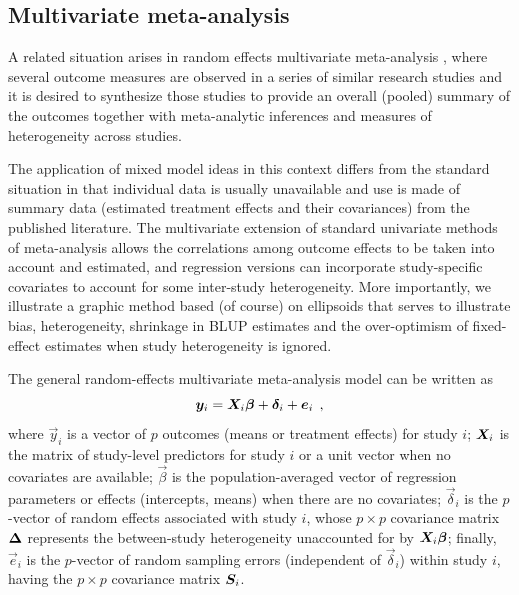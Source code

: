 \subsection{Multivariate meta-analysis}
A related situation arises in random effects multivariate
meta-analysis
\citep{Berkey-etal:1998,Nam-etal:2003},
where several outcome measures are observed in a series of
similar research studies and it is desired to synthesize
those studies to provide an overall (pooled) summary of the outcomes
together with meta-analytic inferences and
measures of heterogeneity across studies.  

The application of mixed model ideas in this context differs
from the standard situation in that individual data is
usually unavailable and use is made of
summary data (estimated treatment effects and their covariances)
from the published literature. The multivariate extension of standard
univariate methods of meta-analysis allows the correlations among
outcome effects to be taken into account and estimated, and
regression versions can incorporate study-specific covariates to
account for some inter-study heterogeneity. More importantly,
we illustrate a graphic method based (of course) on ellipsoids
that serves to illustrate bias, heterogeneity, shrinkage in BLUP
estimates and the over-optimism of fixed-effect estimates when
study heterogeneity is ignored.

The general random-effects multivariate meta-analysis model can be
written as
\begin{equation}\label{eq:mvmeta1}
	\bm{y}_i = \bm{X}_i \bm{\beta} + \bm{\delta}_i + \bm{e}_i \:\: ,
\end{equation}
where $\vec{y}_i$ is a vector of $p$ outcomes (means or treatment effects)
for study $i$; $\bm{X}_i$ is the matrix of study-level predictors
for study $i$ or a unit vector when no covariates are available;
$\vec{\beta}$ is the population-averaged vector of regression parameters
or effects (intercepts, means) when there are no covariates;
$\vec{\delta}_i$ is the $p$-vector of random effects associated with study $i$,
whose $p\times p$ covariance matrix $\bm{\Delta}$ represents the between-study
heterogeneity unaccounted for by $\bm{X}_i \bm{\beta}$;
finally, $\vec{e}_i$ is the $p$-vector of random sampling errors
(independent of $\vec{\delta}_i$)
within study $i$, having the $p\times p$ covariance matrix $\bm{S}_i$.

